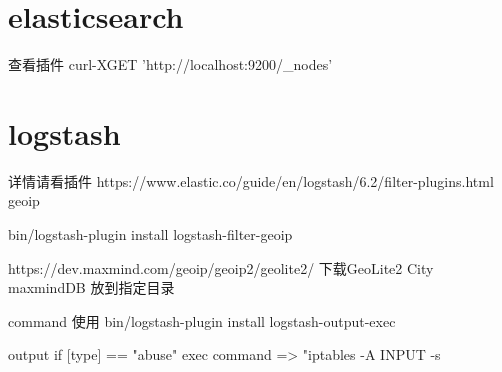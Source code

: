 \chapter{elasticsearch}
查看插件
curl-XGET 'http://localhost:9200/_nodes'


\chapter{logstash}

详情请看插件
https://www.elastic.co/guide/en/logstash/6.2/filter-plugins.html
geoip

bin/logstash-plugin install logstash-filter-geoip

https://dev.maxmind.com/geoip/geoip2/geolite2/  下载GeoLite2 City maxmindDB 放到指定目录

command 使用
bin/logstash-plugin install logstash-output-exec

output {
  if [type] == "abuse" {
    exec {
      command => "iptables -A INPUT -s %
    }
  }
}
